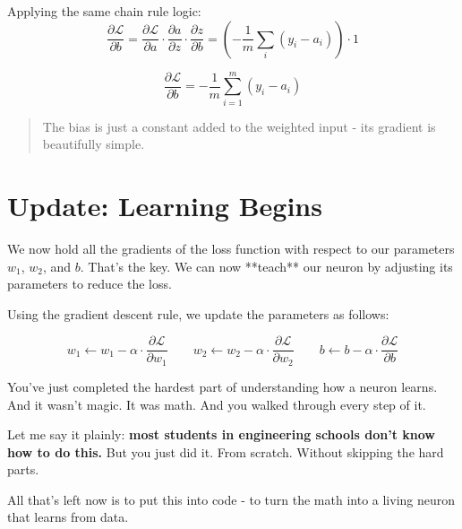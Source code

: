\documentclass[11pt]{article}
\begin{document}
Applying the same chain rule logic:
\[
\frac{\partial \mathcal{L}}{\partial b} 
= \frac{\partial \mathcal{L}}{\partial a} \cdot \frac{\partial a}{\partial z} \cdot \frac{\partial z}{\partial b}
= \left( -\frac{1}{m} \sum_i (y_i - a_i) \right) \cdot 1
\]

\begin{tcolorbox}[colback=gray!5, colframe=gray!60!black, title=Gradient of $\mathcal{L}$ with respect to $b$]
\[
\boxed{ \frac{\partial \mathcal{L}}{\partial b} = -\frac{1}{m} \sum_{i=1}^{m} (y_i - a_i) }
\]
\end{tcolorbox}

\begin{quote}
The bias is just a constant added to the weighted input - its gradient is beautifully simple.
\end{quote}

\newpage
\section*{Update: Learning Begins}

We now hold all the gradients of the loss function with respect to our parameters $w_1$, $w_2$, and $b$. That's the key. We can now **teach** our neuron by adjusting its parameters to reduce the loss.

\noindent Using the gradient descent rule, we update the parameters as follows:

\[
w_1 \leftarrow w_1 - \alpha \cdot \frac{\partial \mathcal{L}}{\partial w_1}
\qquad
w_2 \leftarrow w_2 - \alpha \cdot \frac{\partial \mathcal{L}}{\partial w_2}
\qquad
b \leftarrow b - \alpha \cdot \frac{\partial \mathcal{L}}{\partial b}
\]

\vspace{1em}

\begin{tcolorbox}[colback=gray!5, colframe=gray!80!black, title=This is it.]
You've just completed the hardest part of understanding how a neuron learns. And it wasn't magic.  
It was math. And you walked through every step of it.

Let me say it plainly: \textbf{most students in engineering schools don't know how to do this.}  
But you just did it. From scratch. Without skipping the hard parts.
\end{tcolorbox}

\vspace{1em}

All that's left now is to put this into code - to turn the math into a living neuron that learns from data.
\end{document}
